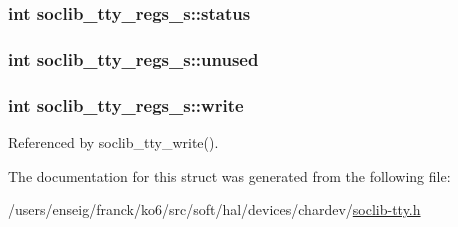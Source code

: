 \hypertarget{structsoclib__tty__regs__s_a6aa0e45df47d0a468508e334b77abc63}{
\subsubsection[{status}]{\setlength{\rightskip}{0pt plus 5cm}int soclib\-\_\-tty\-\_\-regs\-\_\-s\-::status}}\label{structsoclib__tty__regs__s_a6aa0e45df47d0a468508e334b77abc63}
\hypertarget{structsoclib__tty__regs__s_a10fe1a4e54b9ada17beed24b9c659be1}{
\subsubsection[{unused}]{\setlength{\rightskip}{0pt plus 5cm}int soclib\-\_\-tty\-\_\-regs\-\_\-s\-::unused}}\label{structsoclib__tty__regs__s_a10fe1a4e54b9ada17beed24b9c659be1}
\hypertarget{structsoclib__tty__regs__s_ad0f5bc1340be3f28fb65d8174d95c846}{
\subsubsection[{write}]{\setlength{\rightskip}{0pt plus 5cm}int soclib\-\_\-tty\-\_\-regs\-\_\-s\-::write}}\label{structsoclib__tty__regs__s_ad0f5bc1340be3f28fb65d8174d95c846}


Referenced by soclib\-\_\-tty\-\_\-write().



The documentation for this struct was generated from the following file\-:\begin{DoxyCompactItemize}
\item 
/users/enseig/franck/ko6/src/soft/hal/devices/chardev/\hyperlink{soclib-tty_8h}{soclib-\/tty.\-h}\end{DoxyCompactItemize}
